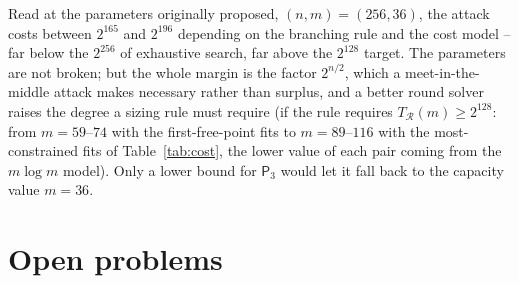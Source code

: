 \documentclass[preprint,12pt]{elsarticle}
\theoremstyle{definition}\newtheorem{defi}[thm]{Definition}\newtheorem{prob}[thm]{Problem}\newtheorem{obs}[thm]{Observation}
\theoremstyle{remark}\newtheorem{rem}[thm]{Remark}
\newcommand{\Pthree}{\mathsf{P}_3}\newcommand{\Conj}[1]{\mathsf{Conj}_{#1}}\newcommand{\Dzero}{\Conj{3}}\newcommand{\TR}{T_{\mathcal R}}
\begin{document}
Read at the parameters originally proposed, $(n,m)=(256,36)$, the attack costs between $2^{165}$ and $2^{196}$ depending on the branching rule and the cost model -- far below the $2^{256}$ of exhaustive search, far above the $2^{128}$ target. The parameters are not broken; but the whole margin is the factor $2^{n/2}$, which a meet-in-the-middle attack makes necessary rather than surplus, and a better round solver raises the degree a sizing rule must require (if the rule requires $\TR(m)\ge2^{128}$: from $m=59$--$74$ with the first-free-point fits to $m=89$--$116$ with the most-constrained fits of
Table~\ref{tab:cost}, the lower value of each pair coming from the $m\log m$ model). Only a lower bound for $\Pthree$ would let it fall back to the capacity value $m=36$.

\section{Open problems}\label{sec:open}
\end{document}

